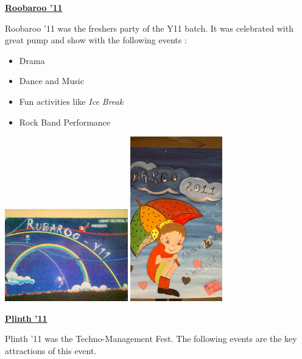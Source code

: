 \documentclass{report}
\begin{document}
\pagebreak
\begin{center}\huge{\bf \underline{Roobaroo '11}}\end{center}
\vspace{.15in}
\hspace{.5in} Roobaroo '11 was the freshers party of the Y11 batch. It was celebrated with great pump and show with the following events :
\begin{itemize}
\item Drama
\item Dance and Music
\item Fun activities like \emph{Ice Break}
\item Rock Band Performance
\end{itemize}
\vspace{.5in}
\begin{center}
\includegraphics [width=0.40\textwidth]{p1.jpg}\hspace{.5in}
\includegraphics [width=0.30\textwidth]{p2.jpg}
\end{center}
\pagebreak
\begin{center}\huge{\bf \underline{Plinth '11}}\end{center}
\vspace{.15in}
\hspace{.5in} Plinth '11 was the Techno-Management Fest. The following events are the key attractions of this event.
\end{document}
